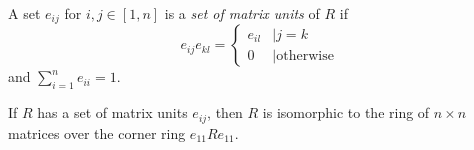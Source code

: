 \begin{definition}
  \label{def:matrixunits}
  \leanok
  A set $e_{ij}$ for $i, j \in [1, n]$ is a \textit{set of matrix units} of $R$ if
  $$
    e_{ij}e_{kl} =
    \begin{cases}
      e_{il} & \mid j = k            \\
      0      & \mid \text{otherwise}\end{cases}
  $$
  and $\sum_{i=1}^n e_{ii} = 1$.
\end{definition}

\begin{theorem}
  \label{thm:ring_with_matrix_units}
  \leanok
  If $R$ has a set of matrix units $e_{ij}$, then $R$ is isomorphic to the ring of $n \times n$ matrices over the corner ring $e_{11}Re_{11}$.
\end{theorem}
